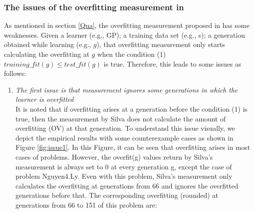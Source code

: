\subsubsection{The issues of the overfitting measurement in \cite{2010Vanneschi} }
As mentioned in section \ref{Qua}, the overfitting measurement proposed in \cite{2010Vanneschi} has some weaknesses. Given a learner (e.g., GP); a training data set (e.g., s); a generation obtained while learning (e.g., $g$), that overfitting measurement only starts calculating the overfitting at $g$ when the condition (1) $training\_fit(g) \le test\_fit(g)$ is true. Therefore, this leads to some issues as follows: 

\begin{enumerate}
\item \textit{The first issue is that measurement ignores some generations in which the learner is overfitted}\\

It is noted that if overfitting arises at a generation before the condition (1) is true, then the measurement by Silva does not calculate the amount of overfitting (OV) at that generation. %
To understand this issue visually, we depict the empirical results with some counterexample cases as shown in Figure \ref{fig:issue1}. In this Figure, it can be seen that overfitting arises in most cases of problems. However, the overfit(g) values return by Silva's measurement is always set to 0 at every generation g, except the case of problem Nguyen4.Ly. Even with this problem, Silva's measurement only calculates the overfitting at generations from 66 and ignores the overfitted generations before that. The corresponding overfitting (rounded) at generations from 66 to 151 of this problem are: \\


\end{enumerate}
